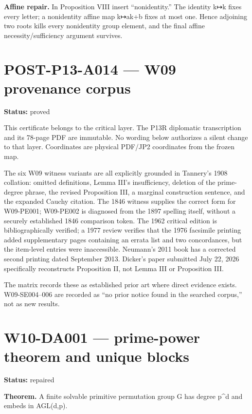 \documentclass[
  10pt,
  a4paper,
]{scrreprt}
\begin{document}
\textbf{Affine repair.} In Proposition VIII insert ``nonidentity.'' The
identity k↦k fixes every letter; a nonidentity affine map k↦ak+b fixes
at most one. Hence adjoining two roots kills every nonidentity group
element, and the final affine necessity/sufficiency argument survives.

\section{POST-P13-A014 --- W09 provenance
corpus}\label{post-p13-a014-w09-provenance-corpus}

\textbf{Status:} proved

This certificate belongs to the critical layer. The P13R diplomatic
transcription and its 78-page PDF are immutable. No wording below
authorizes a silent change to that layer. Coordinates are physical
PDF/JP2 coordinates from the frozen map.

The six W09 witness variants are all explicitly grounded in Tannery's
1908 collation: omitted definitions, Lemma III's insufficiency, deletion
of the prime-degree phrase, the revised Proposition III, a marginal
construction sentence, and the expanded Cauchy citation. The 1846
witness supplies the correct form for W09-PE001; W09-PE002 is diagnosed
from the 1897 spelling itself, without a securely established 1846
comparison token. The 1962 critical edition is bibliographically
verified; a 1977 review verifies that the 1976 facsimile printing added
supplementary pages containing an errata list and two concordances, but
the item-level entries were inaccessible. Neumann's 2011 book has a
corrected second printing dated September 2013. Dicker's paper submitted
July 22, 2026 specifically reconstructs Proposition II, not Lemma III or
Proposition III.

The matrix records these as established prior art where direct evidence
exists. W09-SE004--006 are recorded as ``no prior notice found in the
searched corpus,'' not as new results.

\section{W10-DA001 --- prime-power theorem and unique
blocks}\label{w10-da001-prime-power-theorem-and-unique-blocks}

\textbf{Status:} repaired

\textbf{Theorem.} A finite solvable primitive permutation group G has
degree p\^{}d and embeds in AGL(d,p).
\end{document}
